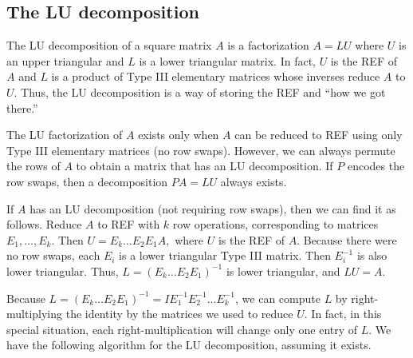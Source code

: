 \subsection*{The LU decomposition}
The LU decomposition of a square matrix $A$ is a factorization $A=LU$ where $U$ is an upper triangular and $L$ is a lower triangular matrix. 
In fact, $U$ is the REF of $A$ and $L$ is a product of Type III elementary matrices whose inverses reduce $A$ to $U$. 
Thus, the LU decomposition is a way of storing the REF and ``how we got there.''

The LU factorization of $A$ exists only when $A$ can be reduced to REF using only Type III elementary matrices (no row swaps). 
However, we can always permute the rows of $A$ to obtain a matrix that has an LU decomposition. 
If $P$ encodes the row swaps, then a decomposition $PA = LU$ always exists. 

If $A$ has an LU decomposition (not requiring row swaps), then we can find it as follows. 
Reduce $A$ to REF with $k$ row operations, corresponding to matrices $E_1, \ldots, E_k$. 
Then $U = E_k \ldots E_2E_1A,$ where $U$ is the REF of $A$. 
Because there were no row swaps, each $E_i$ is a lower triangular Type III matrix. Then $E_i^{-1}$ is also lower triangular. 
Thus, $L=(E_k \ldots E_2E_1)^{-1}$ is lower triangular, and $LU=A.$

Because $L=(E_k \ldots E_2E_1)^{-1} = IE_1^{-1}E_2^{-1}\ldots E_k^{-1}$, we can compute $L$ by right-multiplying the identity by the matrices we used to reduce $U$. 
In fact, in this special situation, each right-multiplication will change only one entry of $L$. 
We have the following algorithm for the LU decomposition, assuming it exists.

%
%

